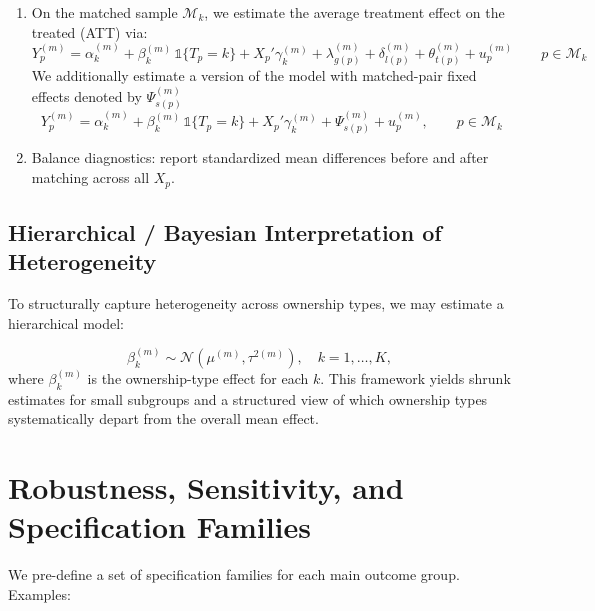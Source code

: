 \documentclass[12pt]{article}
\begin{document}
\begin{enumerate}
    \item On the matched sample $\mathcal{M}_k$, we estimate the average treatment effect on the treated (ATT) via:
    \begin{equation}
    Y^{(m)}_p
    =
    \alpha^{(m)}_{k}
    +
    \beta^{(m)}_{k}\,\mathbb{1}\{T_p = k\}
    +
    X_p' \gamma^{(m)}_{k}
    +
    \lambda^{(m)}_{g(p)}
    +
    \delta^{(m)}_{l(p)}
    +
    \theta^{(m)}_{t(p)}
    +
    u^{(m)}_p
    \qquad p \in \mathcal{M}_k
    \label{eq:psm_FE}
    \end{equation}
We additionally estimate a version of the model with matched-pair fixed effects denoted by $\Psi^{(m)}_{s(p)}$
    \begin{equation}
    Y^{(m)}_p
    =
    \alpha^{(m)}_{k}
    +
    \beta^{(m)}_{k}\,\mathbb{1}\{T_p = k\}
    +
    X_p' \gamma^{(m)}_{k}
    +
    \Psi^{(m)}_{s(p)}
    +
    u^{(m)}_p,
    \qquad p \in \mathcal{M}_k
    \label{eq:psm_subclass_FE}
    \end{equation}




    
    \item Balance diagnostics: report standardized mean differences before and after matching across all $X_p$.

\end{enumerate}

\subsection{Hierarchical / Bayesian Interpretation of Heterogeneity}

To structurally capture heterogeneity across ownership types, we may estimate a hierarchical model:

\[
\beta^{(m)}_k \sim \mathcal{N}(\mu^{(m)}, \tau^{2(m)}), \quad k = 1,\dots,K,
\]
where $\beta^{(m)}_k$ is the ownership-type effect for each $k$. This framework yields shrunk estimates for small subgroups and a structured view of which ownership types systematically depart from the overall mean effect.

\section{Robustness, Sensitivity, and Specification Families}

We pre-define a set of specification families for each main outcome group. Examples:
\end{document}
